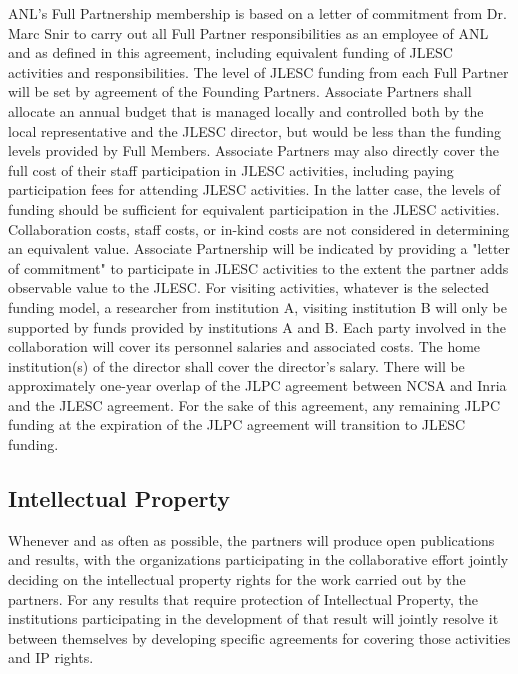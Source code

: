 \documentclass[12pt]{article}
\theoremstyle{definition}
\begin{document}
ANL's Full Partnership membership is based on a letter of commitment from Dr. Marc Snir to carry out all Full Partner responsibilities as an employee of ANL and as defined in this agreement, including equivalent funding of JLESC activities and responsibilities.
The level of JLESC funding from each Full Partner will be set by agreement of the Founding Partners.
Associate Partners shall allocate an annual budget that is managed locally and controlled both by the local representative and the JLESC director, but would be less than the funding levels provided by Full Members. 
Associate Partners may also directly cover the full cost of their staff participation in JLESC activities, including paying participation fees for attending JLESC activities. In the latter case, the levels of funding should be sufficient for equivalent participation in the JLESC activities.  Collaboration costs, staff costs, or in-kind costs are not considered in determining an equivalent value.  Associate Partnership will be indicated by providing a "letter of commitment" to participate in JLESC activities to the extent the partner adds observable value to the JLESC.
For visiting activities, whatever is the selected funding model, a researcher from institution A, visiting institution B will only be supported by funds provided by institutions A and B. 
Each party involved in the collaboration will cover its personnel salaries and associated costs. The home institution(s) of the director shall cover the director's salary.
There will be approximately one-year overlap of the JLPC agreement between NCSA and Inria and the JLESC agreement.  For the sake of this agreement, any remaining JLPC funding at the expiration of the JLPC agreement will transition to JLESC funding. 

\subsection{Intellectual Property}
Whenever and as often as possible, the partners will produce open publications and results, with the organizations participating in the collaborative effort jointly deciding on the intellectual property rights for the work carried out by the partners.  
For any results that require protection of Intellectual Property, the institutions participating in the development of that result will jointly resolve it between themselves by developing specific agreements for covering those activities and IP rights.
\end{document}
